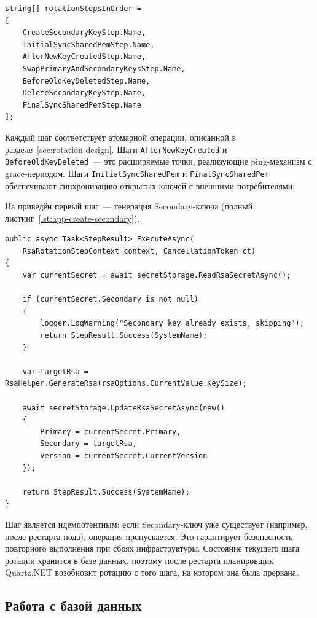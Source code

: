 \begin{lstlisting}[language={[Sharp]C}]
string[] rotationStepsInOrder =
[
    CreateSecondaryKeyStep.Name,
    InitialSyncSharedPemStep.Name,
    AfterNewKeyCreatedStep.Name,
    SwapPrimaryAndSecondaryKeysStep.Name,
    BeforeOldKeyDeletedStep.Name,
    DeleteSecondaryKeyStep.Name,
    FinalSyncSharedPemStep.Name
];
\end{lstlisting}

Каждый шаг соответствует атомарной операции,
описанной в разделе~\ref{sec:rotation-design}.
Шаги \texttt{AfterNewKeyCreated} и \texttt{BeforeOldKeyDeleted}~---
это расширяемые точки, реализующие ping-механизм с grace-периодом.
Шаги \texttt{InitialSyncSharedPem} и \texttt{FinalSyncSharedPem}
обеспечивают синхронизацию открытых ключей с внешними потребителями.

На  приведён
первый шаг~--- генерация Secondary-ключа
(полный листинг~\ref{lst:app-create-secondary}).

\begin{lstlisting}[language={[Sharp]C}]
public async Task<StepResult> ExecuteAsync(
    RsaRotationStepContext context, CancellationToken ct)
{
    var currentSecret = await secretStorage.ReadRsaSecretAsync();

    if (currentSecret.Secondary is not null)
    {
        logger.LogWarning("Secondary key already exists, skipping");
        return StepResult.Success(SystemName);
    }

    var targetRsa = RsaHelper.GenerateRsa(rsaOptions.CurrentValue.KeySize);

    await secretStorage.UpdateRsaSecretAsync(new()
    {
        Primary = currentSecret.Primary,
        Secondary = targetRsa,
        Version = currentSecret.CurrentVersion
    });

    return StepResult.Success(SystemName);
}
\end{lstlisting}

Шаг является идемпотентным:
если Secondary-ключ уже существует (например, после рестарта пода),
операция пропускается.
Это гарантирует безопасность повторного выполнения
при сбоях инфраструктуры.
Состояние текущего шага ротации хранится в базе данных,
поэтому после рестарта планировщик Quartz.NET
возобновит ротацию с того шага, на котором она была прервана.

\subsection{Работа с базой данных}\label{subsec:db-access}

